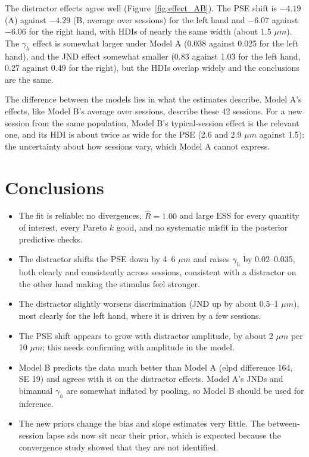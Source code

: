 \documentclass[11pt]{article}
\begin{document}
The distractor effects agree well (Figure~\ref{fig:effect_AB}). The PSE shift is
$-4.19$ (A) against $-4.29$ (B, average over sessions) for the left hand and
$-6.07$ against $-6.06$ for the right hand, with HDIs of nearly the same width
(about 1.5 $\mu m$). The $\gamma_h$ effect is somewhat larger under Model A
(0.038 against 0.025 for the left hand), and the JND effect somewhat smaller
(0.83 against 1.03 for the left hand, 0.27 against 0.49 for the right), but
the HDIs overlap widely and the conclusions are the same.

The difference between the models lies in what the estimates describe. Model
A's effects, like Model B's average over sessions, describe these 42 sessions.
For a new session from the same population, Model B's typical-session effect is
the relevant one, and its HDI is about twice as wide for the PSE (2.6 and
2.9 $\mu m$ against 1.5): the uncertainty about how sessions vary, which Model A
cannot express.

\section{Conclusions}

\begin{itemize}
  \item The fit is reliable: no divergences, $\hat{R} = 1.00$ and large ESS for
        every quantity of interest, every Pareto $k$ good, and no systematic
        misfit in the posterior predictive checks.
  \item The distractor shifts the PSE down by 4--6 $\mu m$ and raises
        $\gamma_h$ by 0.02--0.035, both clearly and consistently across sessions,
        consistent with a distractor on the other hand making the stimulus feel
        stronger.
  \item The distractor slightly worsens discrimination (JND up by about
        0.5--1 $\mu m$), most clearly for the left hand, where it is driven by a
        few sessions.
  \item The PSE shift appears to grow with distractor amplitude, by about
        2 $\mu m$ per 10 $\mu m$; this needs confirming with amplitude in the
        model.
  \item Model B predicts the data much better than Model A (elpd difference 164,
        SE 19) and agrees with it on the distractor effects. Model A's JNDs and
        bimanual $\gamma_h$ are somewhat inflated by pooling, so Model B should be
        used for inference.
  \item The new priors change the bias and slope estimates very little. The
        between-session lapse sds now sit near their prior, which is expected
        because the convergence study showed that they are not identified.
\end{itemize}
\end{document}
